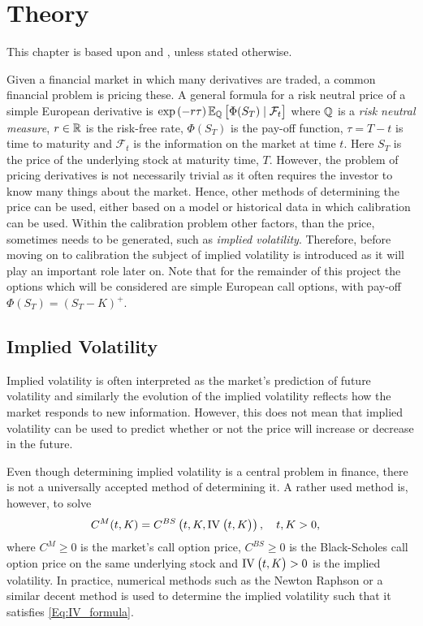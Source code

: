 \chapter{Theory}\label{Ch.2}
This chapter is based upon \citep{Hull} and \citep{Cal}, unless stated otherwise.

Given a financial market in which many derivatives are traded, a common financial problem is pricing these. A general formula for a risk neutral price of a simple European derivative is $\exp\left(-r\tau\right)\E[\Q]{\Phi(S_T)\mid \mathcal{F}_t}$ where $\mathbb{Q}$ is a \emph{risk neutral measure}, $r\in\mathbb{R}$ is the risk-free rate, $\Phi(S_T)$ is the pay-off function, $\tau=T-t$ is time to maturity and $\mathcal{F}_t$ is the information on the market at time $t$. Here $S_T$ is the price of the underlying stock at maturity time, $T$.  However, the problem of pricing derivatives is not necessarily trivial as it often requires the investor to know many things about the market. Hence, other methods of determining the price can be used, either based on a model or historical data in which calibration can be used. Within the calibration problem other factors, than the price, sometimes needs to be generated, such as \emph{implied volatility}. Therefore, before moving on to calibration the subject of implied volatility is introduced as it will play an important role later on. Note that for the remainder of this project the options which will be considered are simple European call options, with pay-off $\Phi(S_T) = (S_T - K)^+$.


\section{Implied Volatility}\label{Sec.Implied_Volatility}
Implied volatility is often interpreted as the market's prediction of future volatility and similarly the evolution of the implied volatility reflects how the market responds to new information. However, this does not mean that implied volatility can be used to predict whether or not the price will increase or decrease in the future.

Even though determining implied volatility is a central problem in finance, there is not a universally accepted method of determining it. A rather used method is, however, to solve
\begin{align}\label{Eq:IV_formula}
    C^{M}(t,K) &= C^{BS}\left(t,K,\IV{t,K}\right),\quad t,K>0,
\end{align}
where $C^{M}\geq0$ is the market's call option price, $C^{BS}\geq0$ is the Black-Scholes call option price on the same underlying stock and $\IV{t,K}>0$ is the implied volatility. In practice, numerical methods such as the Newton Raphson or a similar decent method is used to determine the implied volatility such that it satisfies \eqref{Eq:IV_formula}. 

